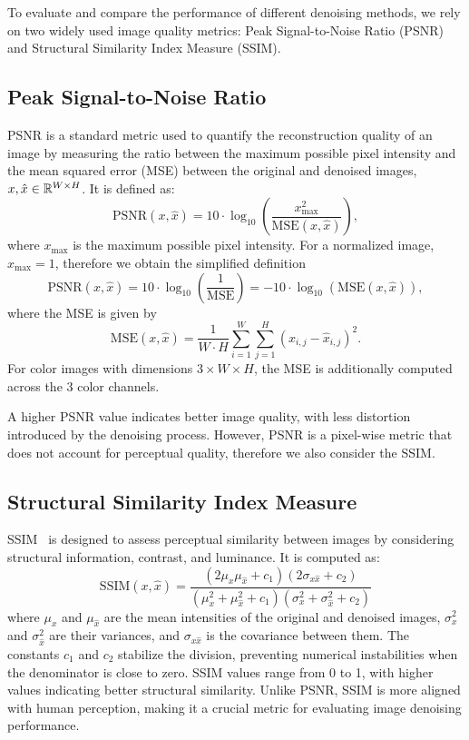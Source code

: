 To evaluate and compare the performance of different denoising methods, we rely on two widely used image quality metrics: Peak Signal-to-Noise Ratio (PSNR) and Structural Similarity Index Measure (SSIM).

\subsection{Peak Signal-to-Noise Ratio}

PSNR is a standard metric used to quantify the reconstruction quality of an image by measuring the ratio between the maximum possible pixel intensity and the mean squared error (MSE) between the original and denoised images, $x, \hat{x} \in \mathbb{R}^{W \times H}$.
It is defined as:
\begin{equation}
    \text{PSNR}(x,\hat{x}) = 10 \cdot \log_{10} \left(\frac{x_{\text{max}}^2}{\text{MSE}(x,\hat{x})}\right),
\end{equation}
where $x_{\text{max}}$ is the maximum possible pixel intensity.
For a normalized image, $x_{\text{max}} = 1$, therefore we obtain the simplified definition
\begin{equation}\label{eq:PSNR}
    \text{PSNR}(x,\hat{x}) = 10 \cdot \log_{10} \left(\frac{1}{\text{MSE}}\right) = -10 \cdot \log_{10}(\text{MSE}(x,\hat{x})),
\end{equation}
where the MSE is given by
\begin{equation}\label{eq:MSE}
    \text{MSE}(x,\hat{x}) = \frac{1}{W \cdot H} \sum_{i=1}^{W} \sum_{j=1}^{H} (x_{i,j} - \hat{x}_{i,j})^2.
\end{equation}
For color images with dimensions $3 \times W \times H$, the MSE is additionally computed across the 3 color channels.

A higher PSNR value indicates better image quality, with less distortion introduced by the denoising process.
However, PSNR is a pixel-wise metric that does not account for perceptual quality, therefore we also consider the SSIM\@.

\subsection{Structural Similarity Index Measure}

SSIM~\cite{SSIM} is designed to assess perceptual similarity between images by considering structural information, contrast, and luminance. It is computed as:
\begin{equation}
\text{SSIM}(x, \hat{x}) = \frac{(2\mu_x \mu_{\hat{x}} + c_1)(2\sigma_{x\hat{x}} + c_2)}{(\mu_x^2 + \mu_{\hat{x}}^2 + c_1)(\sigma_x^2 + \sigma_{\hat{x}}^2 + c_2)}
\end{equation}
where $\mu_x$ and $\mu_{\hat{x}}$ are the mean intensities of the original and denoised images, $\sigma_x^2$ and $\sigma_{\hat{x}}^2$ are their variances, and $\sigma_{x\hat{x}}$ is the covariance between them.
The constants $c_1$ and $c_2$ stabilize the division, preventing numerical instabilities when the denominator is close to zero.
SSIM values range from 0 to 1, with higher values indicating better structural similarity.
Unlike PSNR, SSIM is more aligned with human perception, making it a crucial metric for evaluating image denoising performance.

